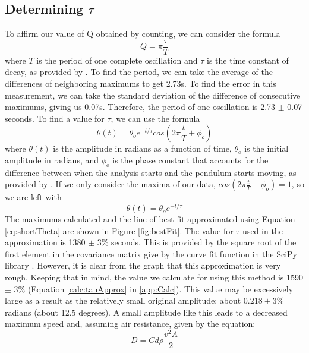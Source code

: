 \documentclass[11pt]{article}
\begin{document}
        \subsection{Determining $\tau$}
            To affirm our value of Q obtained by counting, we can consider the formula
            \begin{equation}
                Q = \pi \frac{\tau}{T}
                \label{eq:qTauRelation}
            \end{equation} 
            where $T$ is the period of one complete oscillation and $\tau$ is the time constant of decay, as provided by \cite{labManual}. To find the period, we can take the average of the differences of neighboring maximums to get 2.73s. To find the error in this measurement, we can take the standard deviation of the difference of consecutive maximums, giving us 0.07s. Therefore, the period of one oscillation is 2.73 $\pm$ 0.07 seconds.
            To find a value for $\tau$, we can use the formula
            \begin{equation}
                \theta(t) = \theta_oe^{-t/\tau}cos(2\pi\frac{t}{T}+\phi_o)
                \label{eq:theta}
            \end{equation}
            where $\theta(t)$ is the amplitude in radians as a function of time, $\theta_o$ is the initial amplitude in radians, and $\phi_o$ is the phase constant that accounts for the difference between when the analysis starts and the pendulum starts moving, as provided by \cite{labManual}. If we only consider the maxima of our data, $cos(2\pi\frac{t}{T}+\phi_o) = 1$, so we are left with 
            \begin{equation}
                \theta(t) = \theta_oe^{-t/\tau}
                \label{eq:shortTheta}
            \end{equation}
            The maximums calculated and the line of best fit approximated using Equation \ref{eq:shortTheta} are shown in Figure \ref{fig:bestFit}. The value for $\tau$ used in the approximation is 1380 $\pm$ 3\% seconds. This is provided by the square root of the first element in the covariance matrix give by the curve fit function in the SciPy library \cite{2020SciPy-NMeth}. However, it is clear from the graph that this approximation is very rough. Keeping that in mind, the value we calculate for using this method is 1590 $\pm$ 3\% (Equation \ref{calc:tauApprox} in \ref{app:Calc}). This value may be excessively large as a result as the relatively small original amplitude; about $0.218 \pm 3\%$ radians (about 12.5 degrees). A small amplitude like this leads to a decreased maximum speed and, assuming air resistance, given by the equation:
            \begin{equation}
                D = Cd\rho\frac{v^2A}{2}
            \end{equation}
            
\end{document}

